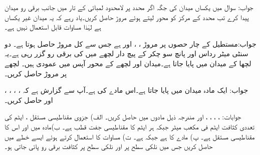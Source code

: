 جواب:
سوال  میں یکساں میدان کی جگہ اگر  محدد پر لامحدود لمبائی کے تار میں  جانب  برقی رو میدان پیدا کرے تب محدد کے مرکز  کو محور لیتے ہوئے مروڑ حاصل کریں۔یاد رہے کہ یہ میدان غیر یکساں ہے لہٰذا مساوات   قابل استعمال نہیں ہے۔

جواب:مستطیل کے چار حصوں پر مروڑ ، ،  اور   ہے جس سے کل مروڑ   حاصل ہوتا ہے۔
دو سنٹی میٹر رداس اور پانچ سو چکر کے پیچ دار لچھے میں  کی برقی رو گزر رہی ہے۔یہ لچھا  کے میدان میں پایا جاتا ہے۔میدان اور لچھے کے محور آپس میں عمودی ہیں۔ لچھے پر مروڑ حاصل کریں۔

جواب:
ایک مادہ  میدان  میں پایا جاتا ہے۔اس مادے کی  ہے۔آپ سے گزارش ہے کہ ، ، ،  ، اور  حاصل کریں۔

جوابات: ، ، ، ،  اور 
مندرجہ ذیل مادوں میں  حاصل کریں۔ الف) جزوی مقناطیسی مستقل ، ایٹم کی تعددی کثافت  ایٹم فی مکعب میٹر جبکہ ہر ایٹم کا مقناطیسی جفت قطب  ہے۔ ب)مادہ میں  اور  اس کا مقناطیسی مستقل  ہے۔ پ) مادے کا  ہے جبکہ  ہے۔ ت) مساوات  کا استعمال کرتے ہوئے  ایسے خطے میں  حاصل کریں جس میں نلکی سطح  پر  اور نلکی سطح  پر  کثافت برقی رو پائی جاتی ہو۔

